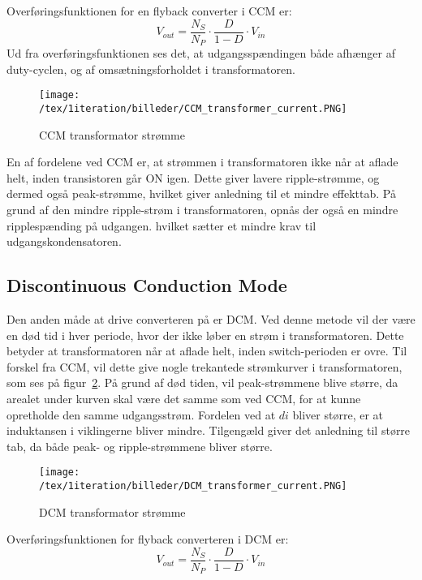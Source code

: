 \noindent Overføringsfunktionen for en flyback converter i CCM er\cite{SMPS-topologies}:
\begin{equation} \label{flyback_converter_CCM_overforinsfunktion}
V_{out} = \frac{N_S}{N_P} \cdot \frac{D}{1-D} \cdot V_{in}
\end{equation}
Ud fra overføringsfunktionen ses det, at udgangsspændingen både afhænger af duty-cyclen, og af omsætningsforholdet i transformatoren. 

\begin{figure}[H]
	\center
	\texttt{[image: /tex/1iteration/billeder/CCM\_transformer\_current.PNG]}
	\caption{CCM transformator strømme
	\cite{SMPS-topologies}}
	\label{fig:CCM_transformer_current}
\end{figure}

\noindent En af fordelene ved CCM er, at strømmen i transformatoren ikke når at aflade helt, inden transistoren går ON igen. Dette giver lavere ripple-strømme, og dermed også peak-strømme, hvilket giver anledning til et mindre effekttab. På grund af den mindre ripple-strøm i transformatoren, opnås der også en mindre ripplespænding på udgangen. hvilket sætter et mindre krav til udgangskondensatoren. 

\subsection{Discontinuous Conduction Mode}
Den anden måde at drive converteren på er DCM. Ved denne metode vil der være en død tid i hver periode, hvor der ikke løber en strøm i transformatoren. Dette betyder at transformatoren når at aflade helt, inden switch-perioden er ovre. Til forskel fra CCM, vil dette give nogle trekantede strømkurver i transformatoren, som ses på figur~\ref{fig:DCM_transformer_current}.
På grund af død tiden, vil peak-strømmene blive større, da arealet under kurven skal være det samme som ved CCM, for at kunne opretholde den samme udgangsstrøm. 
Fordelen ved at $di$ bliver større, er at induktansen i viklingerne bliver mindre. Tilgengæld giver det anledning til større tab, da både peak- og ripple-strømmene bliver større.

\begin{figure}[H]
	\center
	\texttt{[image: /tex/1iteration/billeder/DCM\_transformer\_current.PNG]}
	\caption{DCM transformator strømme
		\cite{SMPS-topologies}}
	\label{fig:DCM_transformer_current}
\end{figure}

Overføringsfunktionen for flyback converteren i DCM er\cite{SMPS-topologies}:
\begin{equation} \label{flyback_converter_DCM_overforinsfunktion}
V_{out} = \frac{N_S}{N_P} \cdot \frac{D}{1-D} \cdot V_{in}
\end{equation}



